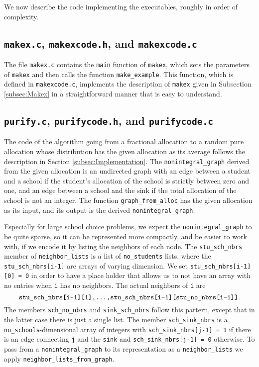 \documentclass[12pt]{article}
\theoremstyle{definition}
\begin{document}
\begin{appendix}
We now describe the code implementing the executables, roughly in
order of complexity.

\subsection{\texttt{makex.c}, \texttt{makexcode.h},  and \texttt{makexcode.c}}

The file \texttt{makex.c} contains the \texttt{main} function of
\texttt{makex}, which sets the parameters of \texttt{makex} and then
calls the function \texttt{make\_example}.  This function, which is
defined in \texttt{makexcode.c}, implements the description of
\texttt{makex} given in Subsection \ref{subsec:Makex} in a
straightforward manner that is easy to understand.

\subsection{\texttt{purify.c}, \texttt{purifycode.h}, and \texttt{purifycode.c}}

The code of the algorithm going from a fractional allocation to a
random pure allocation whose distribution has the given allocation as
its average follows the description in Section
\ref{subsec:Implementation}.  The \texttt{nonintegral\_graph} derived
from the given allocation is an undirected graph with an edge between
a student and a school if the student's allocation of the school is
strictly between zero and one, and an edge between a school and the
sink if the total allocation of the school is not an integer.  The
function \texttt{graph\_from\_alloc} has the given allocation as its
input, and its output is the derived \texttt{nonintegral\_graph}.

Especially for large school choice problems, we expect the
\texttt{nonintegral\_graph} to be quite sparse, so it can be
represented more compactly, and be easier to work with, if we encode
it by listing the neighbors of each node.  The \texttt{stu\_sch\_nbrs}
member of \texttt{neighbor\_lists} is a list of \texttt{no\_students}
lists, where the \texttt{stu\_sch\_nbrs[i-1]} are arrays of varying
dimension. We set \texttt{stu\_sch\_nbrs[i-1][0] = 0} in order to have
a place holder that allows us to not have an array with no entries
when \texttt{i} has no neighbors.  The actual neighbors of \texttt{i}
are
$$\text{\texttt{stu\_sch\_nbrs[i-1][1],...,stu\_sch\_nbrs[i-1][stu\_no\_nbrs[i-1]]}}.$$
The members \texttt{sch\_no\_nbrs} and \texttt{sink\_sch\_nbrs} follow
this pattern, except that in the latter case there is just a single
list.  The member \texttt{sch\_sink\_nbrs} is a
\texttt{no\_schools}-dimensional array of integers with
\texttt{sch\_sink\_nbrs[j-1] = 1} if there is an edge connecting
\texttt{j} and the \texttt{sink} and \texttt{sch\_sink\_nbrs[j-1] = 0}
otherwise.  To pass from a \texttt{nonintegral\_graph} to its
representation as a \texttt{neighbor\_lists} we apply
\texttt{neighbor\_lists\_from\_graph}.


\end{appendix}
\end{document}

